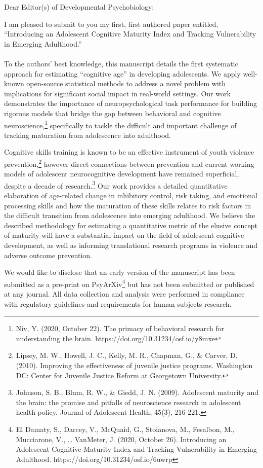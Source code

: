 \documentclass{letter}
\begin{document}
\begin{letter}{}
\opening{Dear Editor(s) of Developmental Psychobiology:}
I am pleased to submit to you my first, first authored paper entitled, ``Introducing an Adolescent Cognitive Maturity Index and Tracking Vulnerability in Emerging Adulthood.'' 
\\ \\
To the authors' best knowledge, this manuscript details the first systematic approach for estimating ``cognitive age'' in developing adolescents. We apply well-known open-source statistical methods to address a novel problem with implications for significant social impact in real-world settings. Our work demonstrates the importance of neuropsychological task performance for building rigorous models that bridge the gap between behavioral and cognitive neuroscience,\footnote[1]{Niv, Y. (2020, October 22). The primacy of behavioral research for understanding the brain. https://doi.org/10.31234/osf.io/y8mxe} specifically to tackle the difficult and important challenge of tracking maturation from adolescence into adulthood. 

Cognitive skills training is known to be an effective instrument of youth violence prevention,\footnote[2]{Lipsey, M. W., Howell, J. C., Kelly, M. R., Chapman, G., \& Carver, D. (2010). Improving the effectiveness of juvenile justice programs. Washington DC: Center for Juvenile Justice Reform at Georgetown University.} however direct connections between prevention and current working models of adolescent neurocognitive development have remained superficial, despite a decade of research.\footnote[3]{Johnson, S. B., Blum, R. W., \& Giedd, J. N. (2009). Adolescent maturity and the brain: the promise and pitfalls of neuroscience research in adolescent health policy. Journal of Adolescent Health, 45(3), 216-221.} Our work provides a detailed quantitative elaboration of age-related change in inhibitory control, risk taking, and emotional processing skills and how the maturation of these skills relates to risk factors in the difficult transition from adolescence into emerging adulthood. We believe the described methodology for estimating a quantitative metric of the elusive concept of maturity will have a substantial impact on the field of adolescent cognitive development, as well as informing translational research programs in violence and adverse outcome prevention. 

We would like to disclose that an early version of the manuscript has been submitted as a pre-print on PsyArXiv\footnote[4]{El Damaty, S., Darcey, V., McQuaid, G., Stoianova, M., Fesalbon, M., Mucciarone, V., … VanMeter, J. (2020, October 26). Introducing an Adolescent Cognitive Maturity Index and Tracking Vulnerability in Emerging Adulthood. https://doi.org/10.31234/osf.io/6uwrp} but has not been submitted or published at any journal. All data collection and analysis were performed in compliance with regulatory guidelines and requirements for human subjects research.


\end{letter}
\end{document}
